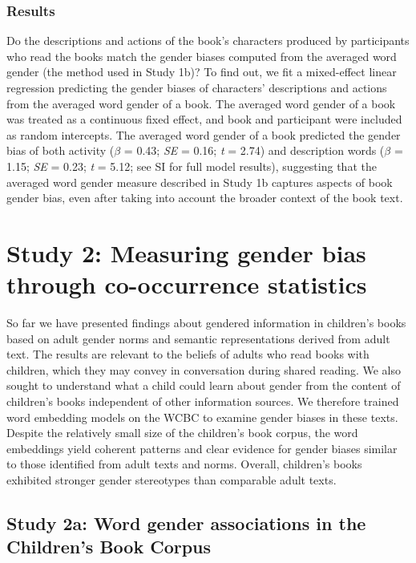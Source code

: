 \documentclass[
  english,
  ,man,floatsintext]{apa6}
\begin{document}
\hypertarget{results-1}{%
\subsubsection{Results}\label{results-1}}

Do the descriptions and actions of the book's characters produced by participants who read the books match the gender biases computed from the averaged word gender (the method used in Study 1b)? To find out, we fit a mixed-effect linear regression predicting the gender biases of characters' descriptions and actions from the averaged word gender of a book. The averaged word gender of a book was treated as a continuous fixed effect, and book and participant were included as random intercepts. The averaged word gender of a book predicted the gender bias of both activity (\(\beta\) = 0.43; \emph{SE} = 0.16; \emph{t} = 2.74) and description words (\(\beta\) = 1.15; \emph{SE} = 0.23; \emph{t} = 5.12; see SI for full model results), suggesting that the averaged word gender measure described in Study 1b captures aspects of book gender bias, even after taking into account the broader context of the book text.

\hypertarget{study-2-measuring-gender-bias-through-co-occurrence-statistics}{%
\section{Study 2: Measuring gender bias through co-occurrence statistics}\label{study-2-measuring-gender-bias-through-co-occurrence-statistics}}

So far we have presented findings about gendered information in children's books based on adult gender norms and semantic representations derived from adult text. The results are relevant to the beliefs of adults who read books with children, which they may convey in conversation during shared reading. We also sought to understand what a child could learn about gender from the content of children's books independent of other information sources. We therefore trained word embedding models on the WCBC to examine gender biases in these texts. Despite the relatively small size of the children's book corpus, the word embeddings yield coherent patterns and clear evidence for gender biases similar to those identified from adult texts and norms. Overall, children's books exhibited stronger gender stereotypes than comparable adult texts.

\hypertarget{study-2a-word-gender-associations-in-the-childrens-book-corpus}{%
\subsection{Study 2a: Word gender associations in the Children's Book Corpus}\label{study-2a-word-gender-associations-in-the-childrens-book-corpus}}
\end{document}
